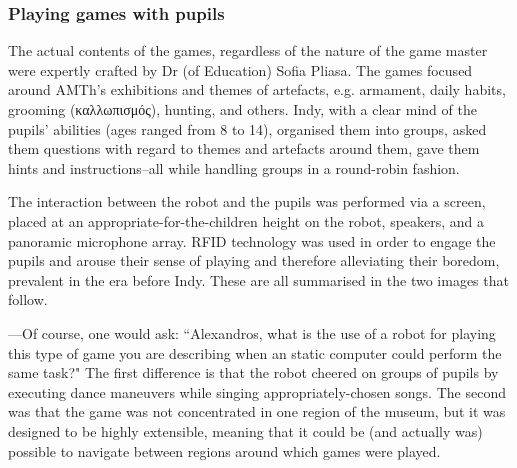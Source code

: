 \subsubsection{Playing games with pupils}

The actual contents of the games, regardless of the nature of the game master
were expertly crafted by Dr (of Education) Sofia Pliasa. The games focused
around AMTh's exhibitions and themes of artefacts, e.g. armament, daily habits,
grooming (καλλωπισμός), hunting, and others. Indy, with a clear mind of the
pupils' abilities (ages ranged from 8 to 14), organised them into groups, asked
them questions with regard to themes and artefacts around them, gave them hints
and instructions--all while handling groups in a round-robin fashion.

The interaction between the robot and the pupils was performed via a screen,
placed at an appropriate-for-the-children height on the robot, speakers, and a
panoramic microphone array. RFID technology was used in order to engage the
pupils and arouse their sense of playing and therefore alleviating their
boredom, prevalent in the era before Indy. These are all summarised in the two
images that follow.

---Of course, one would ask: ``Alexandros, what is the use of a robot for
playing this type of game you are describing when an static computer could
perform the same task?" The first difference is that the robot cheered on
groups of pupils by executing dance maneuvers while singing
appropriately-chosen songs. The second was that the game was not concentrated
in one region of the museum, but it was designed to be highly extensible,
meaning that it could be (and actually was) possible to navigate between
regions around which games were played.


